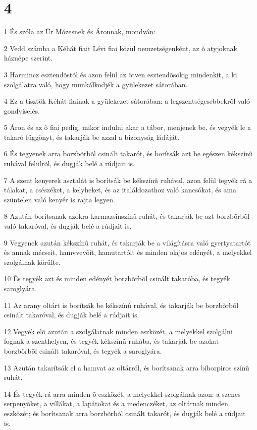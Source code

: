 \chapter{4}

\par 1 És szóla az Úr Mózesnek és Áronnak, mondván:
\par 2 Vedd számba a Kéhát fiait Lévi fiai közül nemzetségenként, az õ atyjoknak háznépe szerint.
\par 3 Harmincz esztendõstõl és azon felül az ötven esztendõsökig mindenkit, a ki szolgálatra való, hogy munkálkodjék a gyülekezet sátorában.
\par 4 Ez a tisztök Kéhát fiainak a gyülekezet sátorában: a legszentségesebbekrõl való gondviselés.
\par 5 Áron és az õ fiai pedig, mikor indulni akar a tábor, menjenek be, és vegyék le a takaró függönyt, és takarják be azzal a bizonyság ládáját.
\par 6 És tegyenek arra borzbõrbõl csinált takarót, és borítsák azt be egészen kékszínû ruhával felülrõl, és dugják belé a rúdjait is.
\par 7 A szent kenyerek asztalát is borítsák be kékszínû ruhával, azon felül tegyék rá a tálakat, a csészéket, a kelyheket, és az italáldozathoz való kancsókat, és ama szüntelen való kenyér is rajta legyen.
\par 8 Azután borítsanak azokra karmazsinszínû ruhát, és takarják be azt borzbõrbõl való takaróval, és dugják belé a rúdjait is.
\par 9 Vegyenek azután kékszínû ruhát, és takarják be a világításra való gyertyatartót és annak mécseit, hamvvevõit, hamutartóit és minden olajos edényét, a melyekkel szolgálnak körülte.
\par 10 És tegyék azt és minden edényét borzbõrbõl csinált takaróba, és tegyék saroglyára.
\par 11 Az arany oltárt is borítsák be kékszínû ruhával, és takarják be borzbõrbõl csinált takaróval, és dugják belé a rúdjait is.
\par 12 Vegyék elõ azután a szolgálatnak minden eszközét, a melyekkel szolgálni fognak a szenthelyen, és tegyék kékszínû ruhába, és takarják be azokat borzbõrbõl csinált takaróval, és tegyék a saroglyára.
\par 13 Azután takarítsák el a hamvat az oltárról, és borítsanak arra bíborpiros színû ruhát.
\par 14 És tegyék rá arra minden õ eszközét, a melyekkel szolgálnak azon: a szenes serpenyõket, a villákat, a lapátokat és a medenczéket, az oltárnak minden eszközét; és borítsanak arra borzbõrbõl csinált takarót, és dugják belé a rúdjait is.
